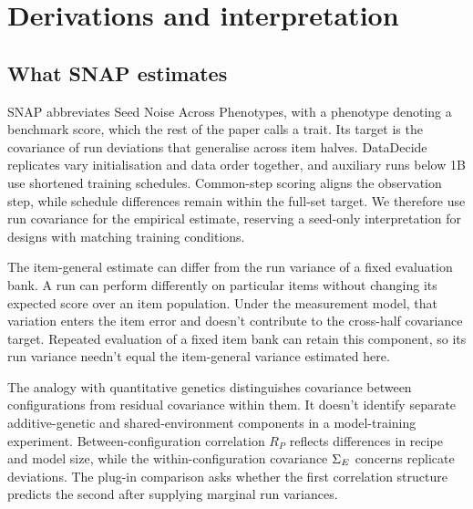 \section{Derivations and interpretation}
\label{app:derivations}
\subsection{What SNAP estimates}
SNAP abbreviates Seed Noise Across Phenotypes, with a phenotype denoting a benchmark score, which the rest of the paper calls a trait. Its target is the covariance of run deviations that generalise across item halves. DataDecide replicates vary initialisation and data order together, and auxiliary runs below 1B use shortened training schedules. Common-step scoring aligns the observation step, while schedule differences remain within the full-set target. We therefore use run covariance for the empirical estimate, reserving a seed-only interpretation for designs with matching training conditions.

The item-general estimate can differ from the run variance of a fixed evaluation bank. A run can perform differently on particular items without changing its expected score over an item population. Under the measurement model, that variation enters the item error and doesn't contribute to the cross-half covariance target. Repeated evaluation of a fixed item bank can retain this component, so its run variance needn't equal the item-general variance estimated here.

The analogy with quantitative genetics distinguishes covariance between configurations from residual covariance within them. It doesn't identify separate additive-genetic and shared-environment components in a model-training experiment. Between-configuration correlation $R_P$ reflects differences in recipe and model size, while the within-configuration covariance $\Sigma_E$ concerns replicate deviations. The plug-in comparison asks whether the first correlation structure predicts the second after supplying marginal run variances.

